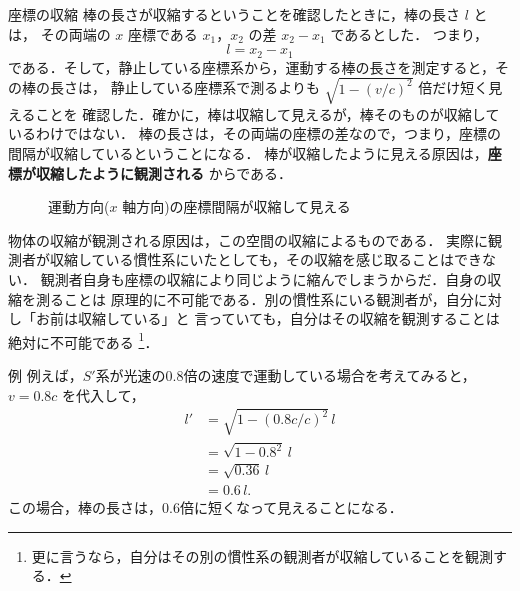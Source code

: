     \begin{memo}{座標の収縮}
    棒の長さが収縮するということを確認したときに，棒の長さ $l$ とは，
    その両端の $x$ 座標である $x_{1}$，$x_{2}$ の差 $x_{2}-x_{1}$ であるとした．
    つまり，
    \begin{equation*}
        l=x_{2}-x_{1}
    \end{equation*}
    である．そして，静止している座標系から，運動する棒の長さを測定すると，その棒の長さは，
    静止している座標系で測るよりも $\sqrt{ 1-(v/c)^{2} }$ 倍だけ短く見えることを
    確認した．確かに，棒は収縮して見えるが，棒そのものが収縮しているわけではない．
    棒の長さは，その両端の座標の差なので，つまり，座標の間隔が収縮しているということになる．
    棒が収縮したように見える原因は，\textbf{座標が収縮したように観測される} からである．
        \begin{figure}[hbt]
            \begin{center}
                \caption{運動方向($x$ 軸方向)の座標間隔が収縮して見える}
                \label{fig:shushuku1}
            \end{center}
        \end{figure}

    物体の収縮が観測される原因は，この空間の収縮によるものである．
    実際に観測者が収縮している慣性系にいたとしても，その収縮を感じ取ることはできない．
    観測者自身も座標の収縮により同じように縮んでしまうからだ．自身の収縮を測ることは
    原理的に不可能である．別の慣性系にいる観測者が，自分に対し「お前は収縮している」と
    言っていても，自分はその収縮を観測することは絶対に不可能である
        \footnote{
            更に言うなら，自分はその別の慣性系の観測者が収縮していることを観測する．
        }．
    \end{memo}

    \begin{memo}{例}
        例えば，$S'$系が光速の0.8倍の速度で運動している場合を考えてみると，
        $v=0.8c$ を代入して，
            \begin{align*}
            l'&=\sqrt{ 1-(0.8c/c)^{2} }\, l \\
              &=\sqrt{ 1-0.8^{2} }\, l \\
              &=\sqrt{ 0.36 }\, l \\
              &=0.6\, l.
            \end{align*}
        この場合，棒の長さは，0.6倍に短くなって見えることになる．
    \end{memo}

